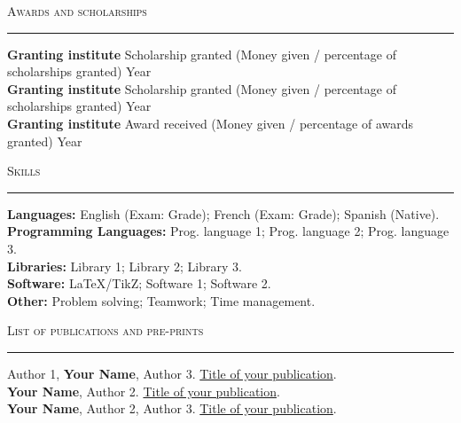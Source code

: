 \documentclass[letterpaper, 11pt]{article}
\begin{document}
\vspace{1.00 ex}

\textsc{Awards and scholarships}
\vspace{1.00 ex}
\hrule


\textbf{Granting institute} \hspace{0.25 ex} Scholarship granted (Money given / percentage of scholarships granted) \hfill Year \\
%
\textbf{Granting institute} \hspace{0.25 ex} Scholarship granted (Money given / percentage of scholarships granted) \hfill Year \\
%
\textbf{Granting institute} \hspace{0.25 ex} Award received (Money given / percentage of awards granted)  \hfill Year

\vspace{1.00 ex}

\textsc{Skills}
\vspace{1.00 ex}
\hrule


\textbf{Languages:} English (Exam: Grade); French (Exam: Grade); Spanish (Native). \\
%
\textbf{Programming Languages:} Prog. language 1; Prog. language 2; Prog. language 3. \\
%
\textbf{Libraries:} Library 1; Library 2; Library 3. \\
%
\textbf{Software:} \LaTeX/TikZ; Software 1; Software 2. \\
%
\textbf{Other:} Problem solving; Teamwork; Time management.

\vspace{1.00 ex}

\textsc{List of publications and pre-prints}
\vspace{1.00 ex}
\hrule


Author 1, \textbf{Your Name}, Author 3. \href{https://arxiv.org/}{Title of your publication}. \\
%
\textbf{Your Name}, Author 2. \href{https://arxiv.org/}{Title of your publication}. \\
%
\textbf{Your Name}, Author 2, Author 3. \href{https://arxiv.org/}{Title of your publication}. %
\end{document}
